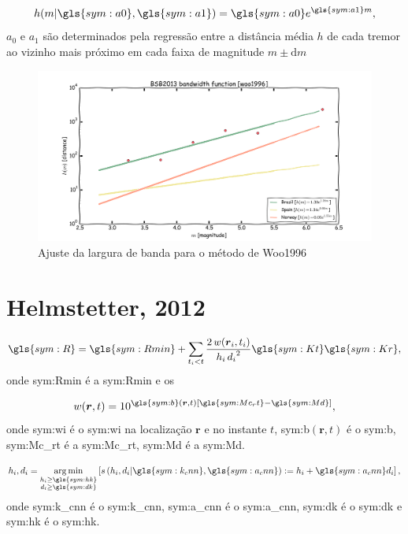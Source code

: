 \documentclass[final]{beamer}
\DeclareMathOperator*{\argmin}{arg\,min}
\begin{document}
\begin{poster}
\small
	\begin{equation}
		\ensuremath{
			h(m\arrowvert \gls{sym:a0}, \gls{sym:a1}) = \gls{sym:a0}e^{\gls{sym:a1}m},
		}
		\label{eq:hm}
	\end{equation}
\footnotesize
$a_0$ e $a_1$ são determinados pela regressão entre a 
distância média $h$ de cada tremor ao vizinho mais próximo em cada faixa de magnitude $m \pm \mathrm{d}m$

\begin{figure}[H]
  \centering
  \includegraphics[width=.5\textwidth]{woo_bandwidth} 
  \caption{Ajuste da largura de banda para o método de Woo1996}
  \label{fig:woo_b} 
\end{figure}


\section{Helmstetter, 2012}
\small
		\begin{equation}
		\ensuremath{\gls{sym:R} = \gls{sym:Rmin} + \sum_{t_i < t}{ 
			\frac{2\,w(\boldsymbol{r}_i,t_i)}{h_i\,{d_i}^2}
					\gls{sym:Kt}\gls{sym:Kr} }},
			\label{eq:helms02}
		\end{equation}
\footnotesize
	onde \gls{sym:Rmin} é a \glsdesc{sym:Rmin} e os

\small
		\begin{equation}
			\ensuremath{ w(\boldsymbol{r},t) = 10^{ \gls{sym:b}(\boldsymbol{r},t) \left[ \gls{sym:Mc_rt} - \gls{sym:Md}
			\right] } },
			\label{eq:helms_wi}
		\end{equation}
\footnotesize
	onde \gls{sym:wi} é o \glsdesc{sym:wi} na localização $\boldsymbol{r}$ e no instante $t$, 
		  \gls{sym:b}$(\boldsymbol{r},t)$ é o \glsdesc{sym:b}, 
		  \gls{sym:Mc_rt} é a \glsdesc{sym:Mc_rt}, 
		  \gls{sym:Md} é a \glsdesc{sym:Md}.


\small
		\begin{equation}
			\ensuremath{
				h_i, d_i = \argmin_{\substack{h_i \ge \gls{sym:hk} \\
								              d_i \ge \gls{sym:dk}}
						           } 
				\left[ s \left(h_i,d_i 
					 		  \arrowvert
							  \gls{sym:k_cnn},\gls{sym:a_cnn}
					     \right) 
					   := h_i + \gls{sym:a_cnn}d_i 
			    \right],
			}
			\label{eq:helms_cnn}
		\end{equation}
\footnotesize
	onde \gls{sym:k_cnn} é o \glsdesc{sym:k_cnn},
		 \gls{sym:a_cnn} é o \glsdesc{sym:a_cnn},
		 \gls{sym:dk} é o \glsdesc{sym:dk} e 
		 \gls{sym:hk} é o \glsdesc{sym:hk}.




\end{poster}
\end{document}
